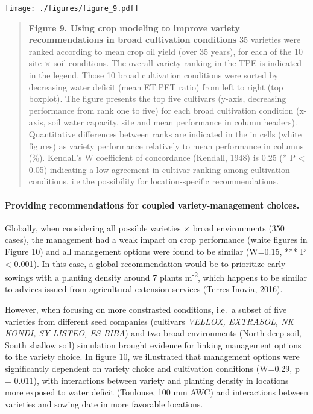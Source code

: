 \documentclass[a4paper]{article}
\let\oldparagraph\paragraph
\renewcommand{\paragraph}[1]{\oldparagraph{#1}\mbox{}}
\begin{document}
\texttt{[image: ./figures/figure\_9.pdf]}

\begin{quote}
\textbf{Figure 9. Using crop modeling to improve variety recommendations
in broad cultivation conditions} 35 varieties were ranked according to
mean crop oil yield (over 35 years), for each of the 10 site \(\times\)
soil conditions. The overall variety ranking in the TPE is indicated in
the legend. Those 10 broad cultivation conditions were sorted by
decreasing water deficit (mean ET:PET ratio) from left to right (top
boxplot). The figure presents the top five cultivars (y-axis, decreasing
performance from rank one to five) for each broad cultivation condition
(x-axis, soil water capacity, site and mean performance in column
headers). Quantitative differences between ranks are indicated in the in
cells (white figures) as variety performance relatively to mean
performance in columns (\%). Kendall's W coefficient of concordance
(Kendall, 1948) is 0.25 (* P \textless{} 0.05) indicating a low
agreement in cultivar ranking among cultivation conditions, i.e the
possibility for location-specific recommendations.
\end{quote}

\paragraph{Providing recommendations for coupled variety-management
choices.}\label{providing-recommendations-for-coupled-variety-management-choices.}

Globally, when considering all possible varieties \(\times\) broad
environments (350 cases), the management had a weak impact on crop
performance (white figures in Figure 10) and all management options were
found to be similar (W=0.15, *** P \textless{} 0.001). In this case, a
global recommendation would be to prioritize early sowings with a
planting density around 7 plants m\textsuperscript{-2}, which happens to
be similar to advices issued from agricultural extension services
(Terres Inovia, 2016).

However, when focusing on more constrasted conditions, i.e.~a subset of
five varieties from different seed companies (cultivars \emph{VELLOX,
EXTRASOL, NK KONDI, SY LISTEO, ES BIBA}) and two broad environments
(North deep soil, South shallow soil) simulation brought evidence for
linking management options to the variety choice. In figure 10, we
illustrated that management options were significantly dependent on
variety choice and cultivation conditions (W=0.29, p = 0.011), with
interactions between variety and planting density in locations more
exposed to water deficit (Toulouse, 100 mm AWC) and interactions between
varieties and sowing date in more favorable locations.
\end{document}
